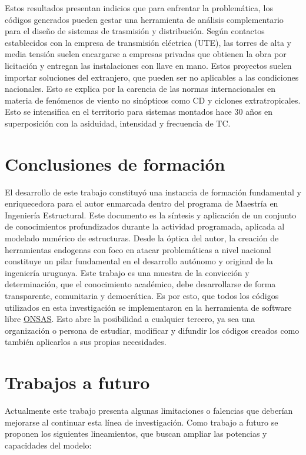 Estos resultados presentan indicios que para enfrentar la problemática, los códigos generados pueden gestar una herramienta de análisis complementario para el diseño de sistemas de trasmisión y distribución. Según contactos establecidos con la empresa de transmisión eléctrica (UTE), las torres de alta y media tensión suelen encargarse a empresas privadas que obtienen la obra por licitación y entregan las instalaciones con llave en mano. Estos proyectos suelen importar soluciones del extranjero, que pueden ser no aplicables a las condiciones nacionales. Esto se explica por la carencia de las normas internacionales en materia de fenómenos de viento no sinópticos como CD y ciclones extratropicales. Esto se intensifica en el territorio para sistemas montados hace 30 años en superposición con la asiduidad, intensidad y frecuencia de TC. 

\section{Conclusiones de formación}
El desarrollo de este trabajo constituyó una instancia de formación fundamental y enriquecedora para el autor enmarcada dentro del programa de Maestría en Ingeniería Estructural. Este documento es la síntesis y aplicación de un conjunto de conocimientos profundizados durante la actividad programada, aplicada al modelado numérico de estructuras. Desde la óptica del autor, la creación de herramientas endogenas con foco en atacar problemáticas a nivel nacional constituye un pilar fundamental en el desarrollo autónomo y original de la ingeniería uruguaya. Este trabajo es una muestra de la convicción y determinación, que el conocimiento académico, debe desarrollarse de forma transparente, comunitaria y democrática. Es por esto, que todos los códigos utilizados en esta investigación se implementaron en la herramienta de software libre \href{https://github.com/ONSAS/ONSAS/}{ONSAS}. Esto abre la posibilidad a cualquier tercero, ya sea una organización o persona de estudiar, modificar y difundir los códigos creados como también aplicarlos a sus propias necesidades. 

\section{Trabajos a futuro}

Actualmente este trabajo presenta algunas limitaciones o falencias que deberían mejorarse al continuar esta línea de investigación. Como trabajo a futuro se proponen los siguientes lineamientos, que buscan ampliar las potencias y capacidades del modelo:

